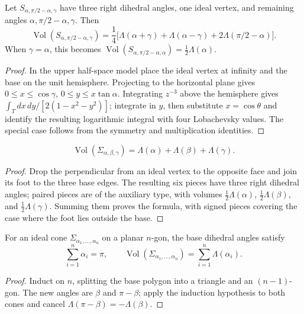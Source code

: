 \begin{lemma}
\label{thurston-ch07-right-angled-simplex-volume}

Let $S_{\alpha,\pi/2-\alpha,\gamma}$ have three right dihedral angles, one ideal vertex, and remaining angles $\alpha,\pi/2-\alpha,\gamma$. Then
\[
\operatorname{Vol}(S_{\alpha,\pi/2-\alpha,\gamma})=
\frac14\bigl[\Lambda(\alpha+\gamma)+\Lambda(\alpha-\gamma)+2\Lambda(\pi/2-\alpha)\bigr].
\]
When $\gamma=\alpha$, this becomes $\operatorname{Vol}(S_{\alpha,\pi/2-\alpha,\alpha})=\frac12\Lambda(\alpha)$.
\end{lemma}
\begin{proof}
\sketch
In the upper half-space model place the ideal vertex at infinity and the base on the unit hemisphere.  Projecting to the horizontal plane gives $0\leq x\leq\cos\gamma$, $0\leq y\leq x\tan\alpha$.  Integrating $z^{-3}$ above the hemisphere gives $\int_T dx\,dy/[2(1-x^2-y^2)]$; integrate in $y$, then substitute $x=\cos\theta$ and identify the resulting logarithmic integral with four Lobachevsky values.  The special case follows from the symmetry and multiplication identities.
\end{proof}

\begin{theorem}
\label{thurston-ch07-ideal-tetrahedron-volume}

\[
\operatorname{Vol}(\Sigma_{\alpha,\beta,\gamma})=\Lambda(\alpha)+\Lambda(\beta)+\Lambda(\gamma).
\]
\end{theorem}
\begin{proof}
\sketch
Drop the perpendicular from an ideal vertex to the opposite face and join its foot to the three base edges.  The resulting six pieces have three right dihedral angles; paired pieces are of the auxiliary type, with volumes $\frac12\Lambda(\alpha)$, $\frac12\Lambda(\beta)$, and $\frac12\Lambda(\gamma)$.  Summing them proves the formula, with signed pieces covering the case where the foot lies outside the base.
\end{proof}

\begin{theorem}
\label{thurston-ch07-ideal-polygonal-cone-volume}

For an ideal cone $\Sigma_{\alpha_1,\ldots,\alpha_n}$ on a planar $n$-gon, the base dihedral angles satisfy
\[
\sum_{i=1}^n\alpha_i=\pi,
\qquad
\operatorname{Vol}(\Sigma_{\alpha_1,\ldots,\alpha_n})=\sum_{i=1}^n\Lambda(\alpha_i).
\]
\end{theorem}
\begin{proof}
\sketch
Induct on $n$, splitting the base polygon into a triangle and an $(n-1)$-gon.  The new angles are $\beta$ and $\pi-\beta$; apply the induction hypothesis to both cones and cancel $\Lambda(\pi-\beta)=-\Lambda(\beta)$.
\end{proof}

